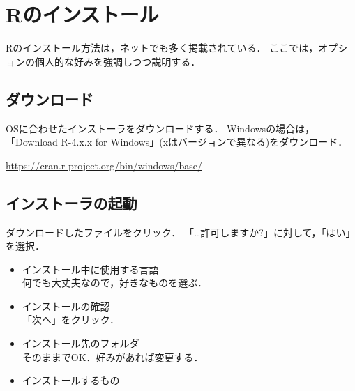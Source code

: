 \documentclass[
]{article}
\providecommand{\tightlist}{%
  \setlength{\itemsep}{0pt}\setlength{\parskip}{0pt}}
\begin{document}
\hypertarget{install}{%
\section{Rのインストール}\label{install}}

Rのインストール方法は，ネットでも多く掲載されている．
ここでは，オプションの個人的な好みを強調しつつ説明する．

\hypertarget{ux30c0ux30a6ux30f3ux30edux30fcux30c9}{%
\subsection{ダウンロード}\label{ux30c0ux30a6ux30f3ux30edux30fcux30c9}}

OSに合わせたインストーラをダウンロードする．
Windowsの場合は，「Download R-4.x.x for Windows」(xはバージョンで異なる)をダウンロード．

\url{https://cran.r-project.org/bin/windows/base/}

\hypertarget{ux30a4ux30f3ux30b9ux30c8ux30fcux30e9ux306eux8d77ux52d5}{%
\subsection{インストーラの起動}\label{ux30a4ux30f3ux30b9ux30c8ux30fcux30e9ux306eux8d77ux52d5}}

ダウンロードしたファイルをクリック．
「\ldots 許可しますか?」に対して，「はい」を選択．

\begin{itemize}
\tightlist
\item
  インストール中に使用する言語\\
  何でも大丈夫なので，好きなものを選ぶ．
\end{itemize}

\begin{itemize}
\tightlist
\item
  インストールの確認\\
  「次へ」をクリック．
\end{itemize}

\begin{itemize}
\tightlist
\item
  インストール先のフォルダ\\
  そのままでOK．好みがあれば変更する．
\end{itemize}

\begin{itemize}
\tightlist
\item
  インストールするもの
\end{itemize}
\end{document}
